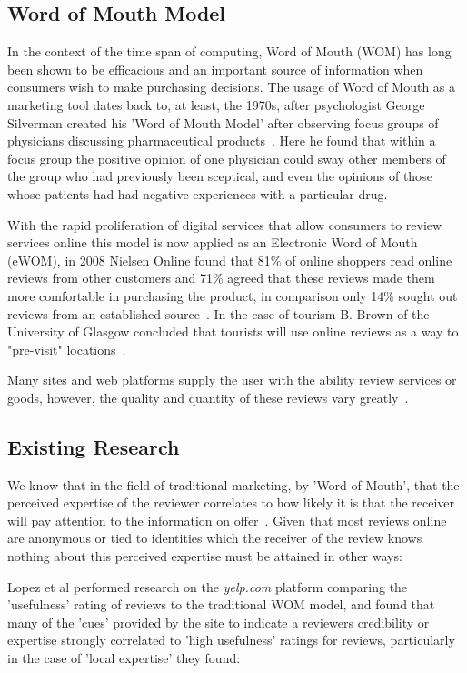 \subsection{Word of Mouth Model}
In the context of the time span of computing, Word of Mouth (WOM) has long been shown to be efficacious and an important source of information when consumers wish to make purchasing decisions\cite{Nielsen}. The usage of Word of Mouth as a marketing tool dates back to, at least, the 1970s, after psychologist George Silverman created his 'Word of Mouth Model' after observing focus groups of physicians discussing pharmaceutical products~\cite{WOM}. Here he found that within a focus group the positive opinion of one physician could sway other members of the group who had previously been sceptical, and even the opinions of those whose patients had had negative experiences with a particular drug.

With the rapid proliferation of digital services that allow consumers to review services online this model is now applied as an Electronic Word of Mouth (eWOM), in 2008 Nielsen Online found that 81\% of online shoppers read online reviews from other customers and 71\% agreed that these reviews made them more comfortable in purchasing the product, in comparison only 14\% sought out reviews from an established source~\cite{Nielsen}. In the case of tourism B. Brown of the University of Glasgow concluded that tourists will use online reviews as a way to "pre-visit" locations~\cite{Brown}.

Many sites and web platforms supply the user with the ability review services or goods, however, the quality and quantity of these reviews vary greatly~\cite{Zhang}.

\subsection{Existing Research}
We know that in the field of traditional marketing, by 'Word of Mouth', that the perceived expertise of the reviewer correlates to how likely it is that the receiver will pay attention to the information on offer~\cite{Bansal}. Given that most reviews online are anonymous or tied to identities which the receiver of the review knows nothing about this perceived expertise must be attained in other ways:

Lopez et al\cite{Lopez} performed research on the \emph{yelp.com} platform comparing the 'usefulness' rating of reviews to the traditional WOM model, and found that many of the 'cues' provided by the site to indicate a reviewers credibility or expertise strongly correlated to 'high usefulness' ratings for reviews, particularly in the case of 'local expertise' they found: 

